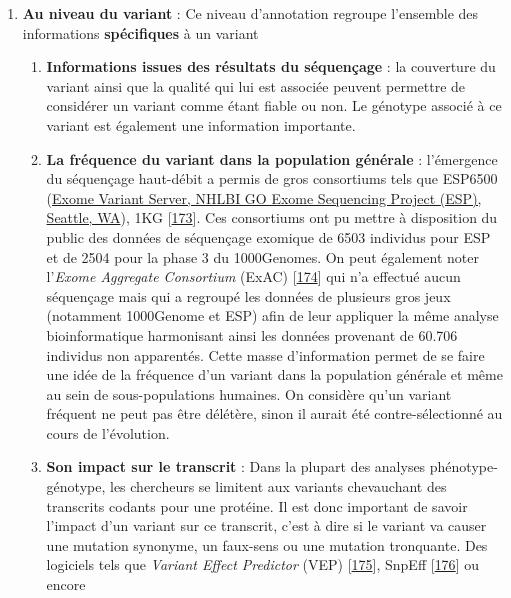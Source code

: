 \documentclass[12pt,a4paper,twoside]{ugathesis}
\providecommand{\tightlist}{%
  \setlength{\itemsep}{0pt}\setlength{\parskip}{0pt}}
\theoremstyle{definition}
\theoremstyle{definition}
\theoremstyle{definition}
\theoremstyle{remark}
\begin{document}
\begin{enumerate}
\def\labelenumi{\arabic{enumi}.}
\tightlist
\item
  \textbf{Au niveau du variant} : Ce niveau d'annotation regroupe
  l'ensemble des informations \textbf{spécifiques} à un variant

  \begin{enumerate}
  \def\labelenumii{\alph{enumii}.}
  \item
    \textbf{Informations issues des résultats du séquençage} : la
    couverture du variant ainsi que la qualité qui lui est associée
    peuvent permettre de considérer un variant comme étant fiable ou
    non. Le génotype associé à ce variant est également une information
    importante.
  \item
    \textbf{La fréquence du variant dans la population générale} :
    l'émergence du séquençage haut-débit a permis de gros consortiums
    tels que ESP6500 (\href{http://evs.gs.washington.edu/EVS/}{Exome
    Variant Server, NHLBI GO Exome Sequencing Project (ESP), Seattle,
    WA}), 1KG
    {[}\protect\hyperlink{ref-1000GenomesProjectConsortium2015}{173}{]}.
    Ces consortiums ont pu mettre à disposition du public des données de
    séquençage exomique de 6503 individus pour ESP et de 2504 pour la
    phase 3 du 1000Genomes. On peut également noter l'\emph{Exome
    Aggregate Consortium} (ExAC)
    {[}\protect\hyperlink{ref-Lek2016}{174}{]} qui n'a effectué aucun
    séquençage mais qui a regroupé les données de plusieurs gros jeux
    (notamment 1000Genome et ESP) afin de leur appliquer la même analyse
    bioinformatique harmonisant ainsi les données provenant de 60.706
    individus non apparentés. Cette masse d'information permet de se
    faire une idée de la fréquence d'un variant dans la population
    générale et même au sein de sous-populations humaines. On considère
    qu'un variant fréquent ne peut pas être délétère, sinon il aurait
    été contre-sélectionné au cours de l'évolution.
  \item
    \textbf{Son impact sur le transcrit} : Dans la plupart des analyses
    phénotype-génotype, les chercheurs se limitent aux variants
    chevauchant des transcrits codants pour une protéine. Il est donc
    important de savoir l'impact d'un variant sur ce transcrit, c'est à
    dire si le variant va causer une mutation synonyme, un faux-sens ou
    une mutation tronquante. Des logiciels tels que \emph{Variant Effect
    Predictor} (VEP) {[}\protect\hyperlink{ref-McLaren2016}{175}{]},
    SnpEff {[}\protect\hyperlink{ref-Cingolani2012}{176}{]} ou encore

\end{enumerate}
\end{enumerate}
\end{document}
